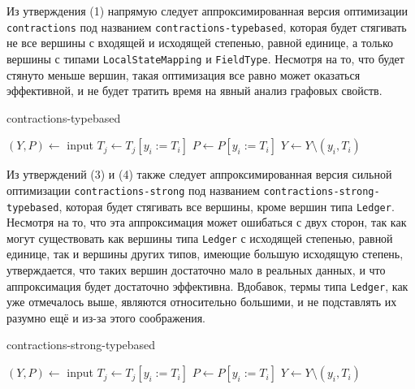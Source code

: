 \documentclass[../thesis.tex]{subfiles}
\begin{document}
Из утверждения (1) напрямую следует аппроксимированная версия оптимизации \texttt{contractions} под названием \texttt{contractions-typebased}, которая будет стягивать не все вершины с входящей и исходящей степенью, равной единице, а только вершины с типами \texttt{LocalStateMapping} и \texttt{FieldType}. Несмотря на то, что будет стянуто меньше вершин, такая оптимизация все равно может оказаться эффективной, и не будет тратить время на явный анализ графовых свойств.

\begin{megaalgorithm}
    \caption{contractions-typebased}
  \begin{algorithmic}
    \State $(Y, P)\gets$ input
        \If{\textcolor{red}{$typeof(y_i)$ is $LocalStateMapping$ or $FieldType$}}
                \State $T_j \gets T_j [y_i := T_i]$
            \EndFor
            \State $P \gets P [y_i := T_i]$
            \State $Y\gets Y \setminus (y_i, T_i)$
        \EndIf
    \EndFor
    \State {}
  \end{algorithmic}
\end{megaalgorithm} 

Из утверждений (3) и (4) также следует аппроксимированная версия сильной оптимизации \texttt{contractions-strong} под названием \texttt{contractions-strong-typebased}, которая будет стягивать все вершины, кроме вершин типа \texttt{Ledger}. Несмотря на то, что эта аппроксимация может ошибаться с двух сторон, так как могут существовать как вершины типа \texttt{Ledger} с исходящей степенью, равной единице, так и вершины других типов, имеющие большую исходящую степень, утверждается, что таких вершин достаточно мало в реальных данных, и что аппроксимация будет достаточно эффективна. Вдобавок, термы типа \texttt{Ledger}, как уже отмечалось выше, являются относительно большими, и не подставлять их разумно ещё и из-за этого соображения.

\begin{megaalgorithm}
    \caption{contractions-strong-typebased}
  \begin{algorithmic}
    \State $(Y, P)\gets$ input
        \If{\textcolor{red}{$typeof(y_i)$ is not $Ledger$}}
                \State $T_j \gets T_j [y_i := T_i]$
            \EndFor
            \State $P \gets P [y_i := T_i]$
            \State $Y\gets Y \setminus (y_i, T_i)$
        \EndIf
    \EndFor
    \State {}
  \end{algorithmic}
\end{megaalgorithm}
\end{document}
